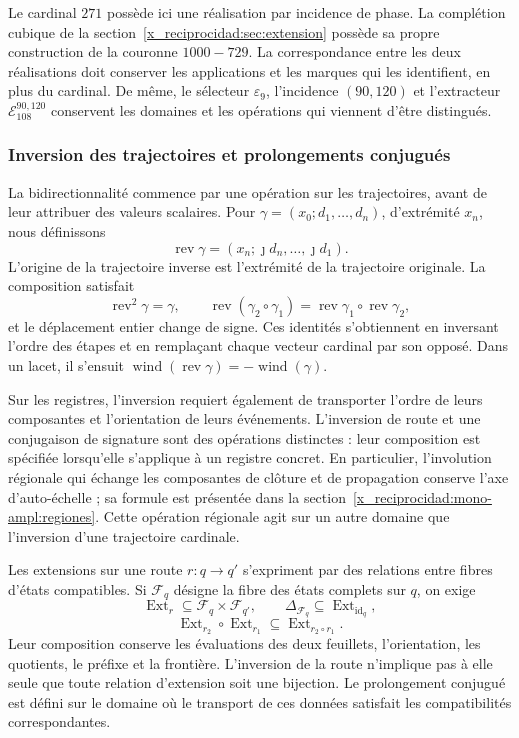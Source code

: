 Le cardinal \(271\) possède ici une réalisation par incidence de phase. La complétion cubique de la section~\ref{x_reciprocidad:sec:extension} possède sa propre construction de la couronne \(1000-729\). La correspondance entre les deux réalisations doit conserver les applications et les marques qui les identifient, en plus du cardinal. De même, le sélecteur \(\varepsilon_9\), l'incidence \((90,120)\) et l'extracteur \(\mathcal E_{108}^{90,120}\) conservent les domaines et les opérations qui viennent d'être distingués.

\subsubsection{Inversion des trajectoires et prolongements conjugués}
\label{x_reciprocidad:tpk-int:bidireccionalidad}

La bidirectionnalité commence par une opération sur les trajectoires, avant
de leur attribuer des valeurs scalaires. Pour
\(\gamma=(x_0;d_1,\ldots,d_n)\), d'extrémité \(x_n\), nous définissons
\[
 \operatorname{rev}\gamma
   =(x_n;\jmath d_n,\ldots,\jmath d_1).
\]
L'origine de la trajectoire inverse est l'extrémité de la trajectoire originale.
La composition satisfait
\[
 \operatorname{rev}^2\gamma=\gamma,\qquad
 \operatorname{rev}(\gamma_2\circ\gamma_1)
   =\operatorname{rev}\gamma_1\circ\operatorname{rev}\gamma_2,
\]
et le déplacement entier change de signe. Ces identités s'obtiennent
en inversant l'ordre des étapes et en remplaçant chaque vecteur cardinal par
son opposé. Dans un lacet, il s'ensuit
\(\operatorname{wind}(\operatorname{rev}\gamma)
=-\operatorname{wind}(\gamma)\).

Sur les registres, l'inversion requiert également de transporter l'ordre
de leurs composantes et l'orientation de leurs événements. L'inversion de
route et une conjugaison de signature sont des opérations distinctes : leur
composition est spécifiée lorsqu'elle s'applique à un registre concret. En
particulier, l'involution régionale qui échange les composantes de
clôture et de propagation conserve l'axe d'auto-échelle ; sa formule est
présentée dans la section~\ref{x_reciprocidad:mono-ampl:regiones}. Cette opération régionale
agit sur un autre domaine que l'inversion d'une trajectoire cardinale.

Les extensions sur une route \(r:q\to q'\) s'expriment par des relations entre fibres d'états compatibles. Si \(\mathcal F_q\) désigne la fibre des états complets sur \(q\), on exige
\[
 \operatorname{Ext}_r\subseteq\mathcal F_q\times\mathcal F_{q'},
 \qquad \Delta_{\mathcal F_q}\subseteq
        \operatorname{Ext}_{\operatorname{id}_q},
\]
\[
 \operatorname{Ext}_{r_2}\circ\operatorname{Ext}_{r_1}
       \subseteq\operatorname{Ext}_{r_2\circ r_1}.
\]
Leur composition conserve les évaluations des deux feuillets, l'orientation,
les quotients, le préfixe et la frontière. L'inversion de la route
n'implique pas à elle seule que toute relation d'extension soit une bijection.
Le prolongement conjugué est défini sur le domaine où le transport de
ces données satisfait les compatibilités correspondantes.

